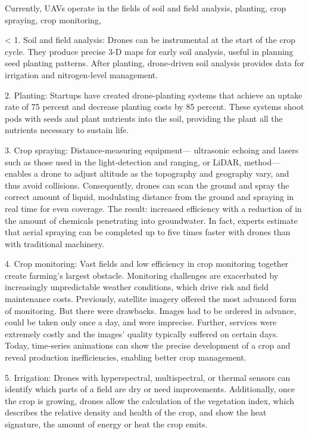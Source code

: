 Currently, UAVs operate in
the fields of
soil and field analysis,
planting,
crop spraying,
crop monitoring,




<
1. Soil and field analysis: 
Drones can be instrumental at the start of the crop cycle. 
They produce precise 3-D maps for early soil analysis, 
useful in planning seed planting patterns. 
After planting, drone-driven soil analysis provides data for 
irrigation and nitrogen-level management.

2. Planting: 
Startups have created drone-planting systems 
that achieve an uptake rate of 75 percent and 
decrease planting costs by 85 percent. 
These systems shoot pods with seeds and 
plant nutrients into the soil, 
providing the plant all the nutrients 
necessary to sustain life.

3. Crop spraying: 
Distance-measuring equipment—
ultrasonic echoing and 
lasers such as those used in the light-detection and ranging, 
or LiDAR, method—
enables a drone to adjust altitude 
as the topography and geography vary, and 
thus avoid collisions. 
Consequently, drones can scan the ground and 
spray the correct amount of liquid, 
modulating distance from the ground and 
spraying in real time for even coverage. 
The result: increased efficiency 
with a reduction of in the amount of chemicals 
penetrating into groundwater. 
In fact, experts estimate that aerial spraying 
can be completed up to five times faster with drones 
than with traditional machinery.

4. Crop monitoring: 
Vast fields and low efficiency in crop monitoring together 
create farming’s largest obstacle. 
Monitoring challenges are exacerbated 
by increasingly unpredictable weather conditions, 
which drive risk and field maintenance costs. 
Previously, satellite imagery offered the most advanced form of monitoring. 
But there were drawbacks. 
Images had to be ordered in advance, 
could be taken only once a day, 
and were imprecise. 
Further, services were extremely costly and 
the images’ quality typically suffered on certain days. 
Today, time-series animations 
can show the precise development of a crop and 
reveal production inefficiencies, 
enabling better crop management.

5. Irrigation: 
Drones with hyperspectral, multispectral, or thermal sensors 
can identify which parts of a field are dry or need improvements. 
Additionally, once the crop is growing, 
drones allow the calculation of the vegetation index, 
which describes the relative density and health of the crop, 
and show the heat signature, the amount of energy or heat the crop emits.

